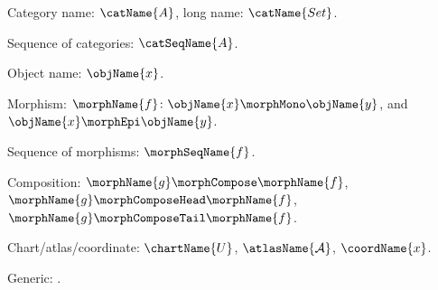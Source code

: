 Category name: $\catName{A}$, long name: $\catName{Set}$.

Sequence of categories: $\catSeqName{A}$.

Object name: $\objName{x}$.

Morphism: $\morphName{f} \colon \objName{x} \morphMono \objName{y}$,
and $\objName{x} \morphEpi \objName{y}$.

Sequence of morphisms: $\morphSeqName{f}$.

Composition: $\morphName{g} \morphCompose \morphName{f}$,
$\morphName{g} \morphComposeHead \morphName{f}$,
$\morphName{g} \morphComposeTail \morphName{f}$.

Chart/atlas/coordinate: $\chartName{U}$, $\atlasName{\mathcal{A}}$,
$\coordName{x}$.

Generic: .
